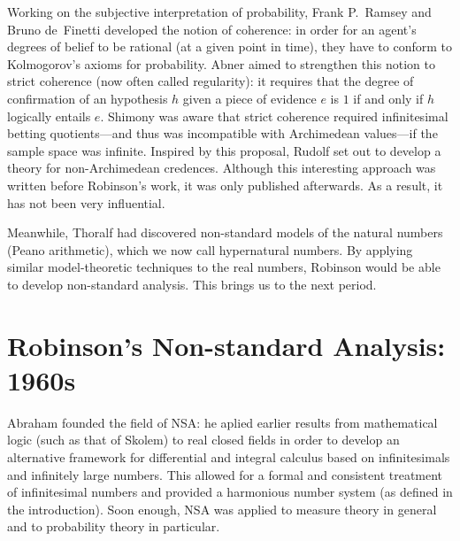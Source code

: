 Working on the subjective interpretation of probability, Frank P.\ Ramsey and Bruno de~Finetti developed the notion of coherence: in order for an agent's degrees of belief to be rational (at a given point in time), they have to conform to Kolmogorov's axioms for probability. Abner \citet{Shimony:1955} aimed to strengthen this notion to strict coherence (now often called regularity): it requires that the degree of confirmation of an hypothesis $h$ given a piece of evidence $e$ is $1$ if and only if $h$ logically entails $e$. Shimony was aware that strict coherence required infinitesimal betting quotients---and thus was incompatible with Archimedean values---if the sample space was infinite. Inspired by this proposal, Rudolf \citet{Carnap:1980} set out to develop a theory for non-Archimedean credences. Although this interesting approach was written before Robinson's work, it was only published afterwards. As a result, it has not been very influential.

Meanwhile, Thoralf \citet{Skolem:1934} had discovered non-standard models of the natural numbers (Peano arithmetic), which we now call hypernatural numbers. By applying similar model-theoretic techniques to the real numbers, Robinson would be able to develop non-standard analysis. This brings us to the next period.

\section{Robinson's Non-standard Analysis: 1960s}
Abraham \citet{Robinson:1961,Robinson:1966} founded the field of NSA: he aplied earlier results from mathematical logic (such as that of Skolem) to real closed fields in order to develop an alternative framework for differential and integral calculus based on infinitesimals and infinitely large numbers. This allowed for a formal and consistent treatment of infinitesimal numbers and provided a harmonious number system (as defined in the introduction). Soon enough, NSA was applied to measure theory in general and to probability theory in particular.

